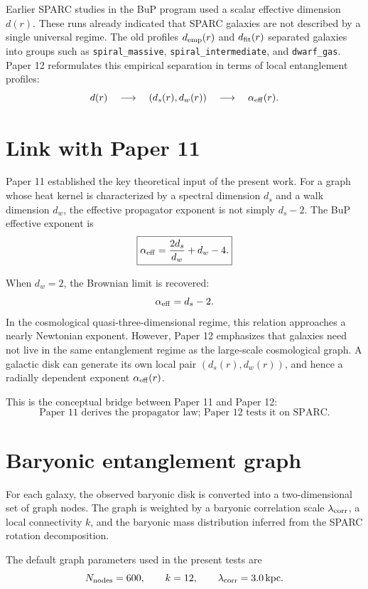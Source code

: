 \documentclass[11pt,a4paper]{article}
\begin{document}
Earlier SPARC studies in the BuP program used a scalar effective dimension
\(d(r)\). These runs already indicated that SPARC galaxies are not described by
a single universal regime. The old profiles \(d_{\rm emp}(r)\) and
\(d_{\rm fit}(r)\) separated galaxies into groups such as
\texttt{spiral\_massive}, \texttt{spiral\_intermediate}, and
\texttt{dwarf\_gas}. Paper 12 reformulates this empirical separation in terms
of local entanglement profiles:
\[
d(r)
\quad\longrightarrow\quad
(d_s(r),d_w(r))
\quad\longrightarrow\quad
\alpha_{\rm eff}(r).
\]

\section{Link with Paper 11}

Paper 11 established the key theoretical input of the present work. For a graph
whose heat kernel is characterized by a spectral dimension \(d_s\) and a walk
dimension \(d_w\), the effective propagator exponent is not simply
\(d_s-2\). The BuP effective exponent is
\[
\boxed{
\alpha_{\rm eff}
=
\frac{2d_s}{d_w}+d_w-4.
}
\]

When \(d_w=2\), the Brownian limit is recovered:
\[
\alpha_{\rm eff}=d_s-2.
\]
In the cosmological quasi-three-dimensional regime, this relation approaches a
nearly Newtonian exponent. However, Paper 12 emphasizes that galaxies need not
live in the same entanglement regime as the large-scale cosmological graph. A
galactic disk can generate its own local pair \((d_s(r),d_w(r))\), and hence a
radially dependent exponent \(\alpha_{\rm eff}(r)\).

This is the conceptual bridge between Paper 11 and Paper 12:
\[
\boxed{
\text{Paper 11 derives the propagator law; Paper 12 tests it on SPARC.}
}
\]

\section{Baryonic entanglement graph}

For each galaxy, the observed baryonic disk is converted into a two-dimensional
set of graph nodes. The graph is weighted by a baryonic correlation scale
\(\lambda_{\rm corr}\), a local connectivity \(k\), and the baryonic mass
distribution inferred from the SPARC rotation decomposition.

The default graph parameters used in the present tests are
\[
N_{\rm nodes}=600,
\qquad
k=12,
\qquad
\lambda_{\rm corr}=3.0\,{\rm kpc}.
\]
\end{document}
